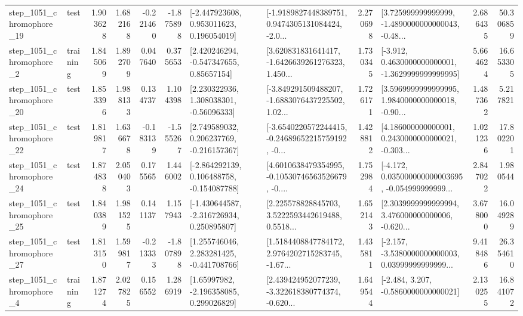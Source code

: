 \begin{tabular}{llrrrrllrlrr}
 step\_1051\_chromophore\_19 &      test &      1.903628 &    1.682168 &     -0.221460 & -1.875898 &    [-2.447923608, 0.953011623, 0.196054019] &  [-1.9189827448389751, 0.9474305131084424, -2.0... &       2.270698 &  [3.725999999999999, -1.4890000000000043, -0.48... &            2.686435 &         50.306859 \\
  step\_1051\_chromophore\_2 &  training &      1.845069 &    1.892709 &      0.047640 &  0.375653 &     [2.420246294, -0.547347655, 0.85657154] &  [3.620831831641417, -1.6426639261276323, 1.450... &       1.730345 &  [-3.912, 0.4630000000000001, -1.3629999999999995] &            5.664624 &         16.653305 \\
 step\_1051\_chromophore\_20 &      test &      1.853396 &    1.988133 &      0.134737 &  1.104398 &     [2.230322936, 1.308038301, -0.56096333] &  [-3.849291509488207, -1.6883076437225502, 1.02... &       1.726171 &  [3.5969999999999995, 1.9840000000000018, -0.90... &            1.487362 &          5.217821 \\
 step\_1051\_chromophore\_22 &      test &      1.819817 &    1.636678 &     -0.183139 & -1.555267 &    [2.749589032, 0.206237769, -0.216157367] &  [-3.6540220572244415, -0.24689652215759192, -0... &       1.428812 &  [4.186000000000001, 0.2430000000000021, -0.303... &            1.021236 &         17.802201 \\
 step\_1051\_chromophore\_24 &      test &      1.874838 &    2.050403 &      0.175565 &  1.446002 &   [-2.864292139, 0.106488758, -0.154087788] &  [4.6010638479354995, -0.10530746563526679, -0.... &       1.752984 &  [-4.172, 0.035000000000003695, -0.054999999999... &            2.847022 &          1.980544 \\
 step\_1051\_chromophore\_25 &      test &      1.840389 &    1.981525 &      0.141137 &  1.157943 &   [-1.430644587, -2.316726934, 0.250895807] &  [2.225578828845703, 3.5222593442619488, 0.5518... &       1.652143 &  [2.3039999999999994, 3.476000000000006, -0.620... &            3.678000 &         16.049289 \\
 step\_1051\_chromophore\_27 &      test &      1.813150 &    1.599817 &     -0.213333 & -1.807898 &    [1.255746046, 2.283281425, -0.441708766] &  [1.5184408847784172, 2.9764202715283745, -1.67... &       1.435811 &  [-2.157, -3.5380000000000003, 0.03999999999999... &            9.418486 &         26.354610 \\
  step\_1051\_chromophore\_4 &  training &      1.871274 &    2.027825 &      0.156552 &  1.286919 &     [1.65997982, -2.196358085, 0.299026829] &  [2.439424952077239, -3.322618380774374, -0.620... &       1.649544 &               [-2.484, 3.207, -0.5860000000000021] &            2.130255 &         16.841072 \\

\end{tabular}
